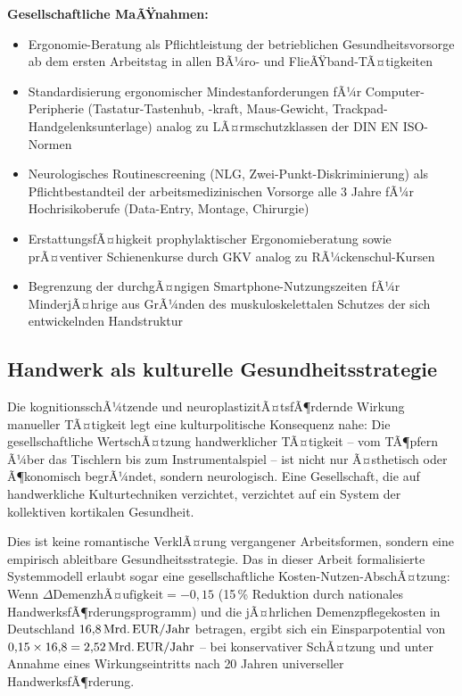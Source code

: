 ﻿\documentclass[12pt,a4paper]{report}
\theoremstyle{plain}
\theoremstyle{definition}
\theoremstyle{remark}
\begin{document}
\textbf{Gesellschaftliche MaÃŸnahmen:}
\begin{itemize}
\item Ergonomie-Beratung als Pflichtleistung der betrieblichen
  Gesundheitsvorsorge ab dem ersten Arbeitstag in allen BÃ¼ro- und
  FlieÃŸband-TÃ¤tigkeiten
\item Standardisierung ergonomischer Mindestanforderungen fÃ¼r
  Computer-Peripherie (Tastatur-Tastenhub, -kraft, Maus-Gewicht,
  Trackpad-Handgelenksunterlage) analog zu LÃ¤rmschutzklassen
  der DIN EN ISO-Normen
\item Neurologisches Routinescreening (NLG, Zwei-Punkt-Diskriminierung)
  als Pflichtbestandteil der arbeitsmedizinischen Vorsorge alle 3 Jahre
  fÃ¼r Hochrisikoberufe (Data-Entry, Montage, Chirurgie)
\item ErstattungsfÃ¤higkeit prophylaktischer Ergonomieberatung sowie
  prÃ¤ventiver Schienenkurse durch GKV analog zu RÃ¼ckenschul-Kursen
\item Begrenzung der durchgÃ¤ngigen Smartphone-Nutzungszeiten fÃ¼r
  MinderjÃ¤hrige aus GrÃ¼nden des muskuloskelettalen Schutzes der
  sich entwickelnden Handstruktur
\end{itemize}

\subsection{Handwerk als kulturelle Gesundheitsstrategie}

Die kognitionsschÃ¼tzende und neuroplastizitÃ¤tsfÃ¶rdernde Wirkung
manueller TÃ¤tigkeit legt eine kulturpolitische Konsequenz nahe:
Die gesellschaftliche WertschÃ¤tzung handwerklicher TÃ¤tigkeit --
vom TÃ¶pfern Ã¼ber das Tischlern bis zum Instrumentalspiel -- ist nicht
nur Ã¤sthetisch oder Ã¶konomisch begrÃ¼ndet, sondern neurologisch.
Eine Gesellschaft, die auf handwerkliche Kulturtechniken verzichtet,
verzichtet auf ein System der kollektiven kortikalen Gesundheit.

Dies ist keine romantische VerklÃ¤rung vergangener Arbeitsformen, sondern
eine empirisch ableitbare Gesundheitsstrategie. Das in dieser Arbeit
formalisierte Systemmodell erlaubt sogar eine gesellschaftliche
Kosten-Nutzen-AbschÃ¤tzung: Wenn $\Delta\text{DemenzhÃ¤ufigkeit} = -0{,}15$
(15\,\% Reduktion durch nationales HandwerksfÃ¶rderungsprogramm) und
die jÃ¤hrlichen Demenzpflegekosten in Deutschland $16{,}8\,\text{Mrd.\,EUR}/
\text{Jahr}$ betragen, ergibt sich ein Einsparpotential von
$0{,}15 \times 16{,}8 = 2{,}52\,\text{Mrd.\,EUR}/\text{Jahr}$ --
bei konservativer SchÃ¤tzung und unter Annahme eines Wirkungseintritts
nach 20 Jahren universeller HandwerksfÃ¶rderung.
\end{document}
